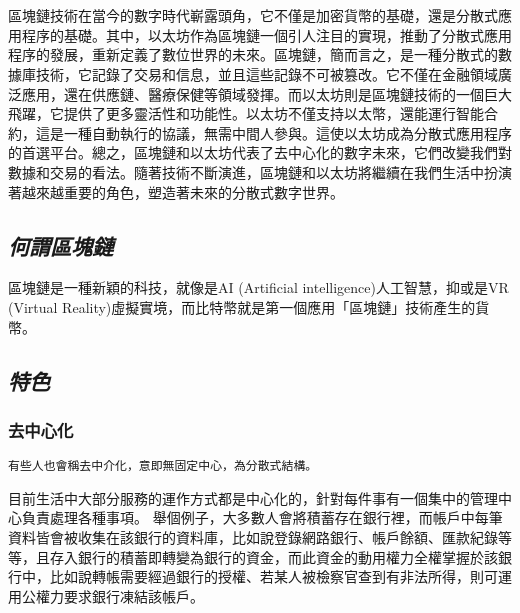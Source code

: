 \chapter{}

\BB 區塊鏈技術在當今的數字時代嶄露頭角，它不僅是加密貨幣的基礎，還是分散式應用程序的基礎。其中，以太坊作為區塊鏈一個引人注目的實現，推動了分散式應用程序的發展，重新定義了數位世界的未來。區塊鏈，簡而言之，是一種分散式的數據庫技術，它記錄了交易和信息，並且這些記錄不可被篡改。它不僅在金融領域廣泛應用，還在供應鏈、醫療保健等領域發揮。而以太坊則是區塊鏈技術的一個巨大飛躍，它提供了更多靈活性和功能性。以太坊不僅支持以太幣，還能運行智能合約，這是一種自動執行的協議，無需中間人參與。這使以太坊成為分散式應用程序的首選平台。總之，區塊鏈和以太坊代表了去中心化的數字未來，它們改變我們對數據和交易的看法。隨著技術不斷演進，區塊鏈和以太坊將繼續在我們生活中扮演著越來越重要的角色，塑造著未來的分散式數字世界。
\section{\textit {\SK 何謂區塊鏈}}
區塊鏈是一種新穎的科技，就像是AI (Artificial intelligence)人工智慧，抑或是VR (Virtual Reality)虛擬實境，而比特幣就是第一個應用「區塊鏈」技術產生的貨幣。

\section{\textsl {\SK 特色}}

\subsection{\textbf {\SK 去中心化}}
\bigskip
	\begin{lstlisting}
有些人也會稱去中介化，意即無固定中心，為分散式結構。
	\end{lstlisting}
\bigskip
目前生活中大部分服務的運作方式都是中心化的，針對每件事有一個集中的管理中心負責處理各種事項。
舉個例子，大多數人會將積蓄存在銀行裡，而帳戶中每筆資料皆會被收集在該銀行的資料庫，比如說登錄網路銀行、帳戶餘額、匯款紀錄等等，且存入銀行的積蓄即轉變為銀行的資金，而此資金的動用權力全權掌握於該銀行中，比如說轉帳需要經過銀行的授權、若某人被檢察官查到有非法所得，則可運用公權力要求銀行凍結該帳戶。

